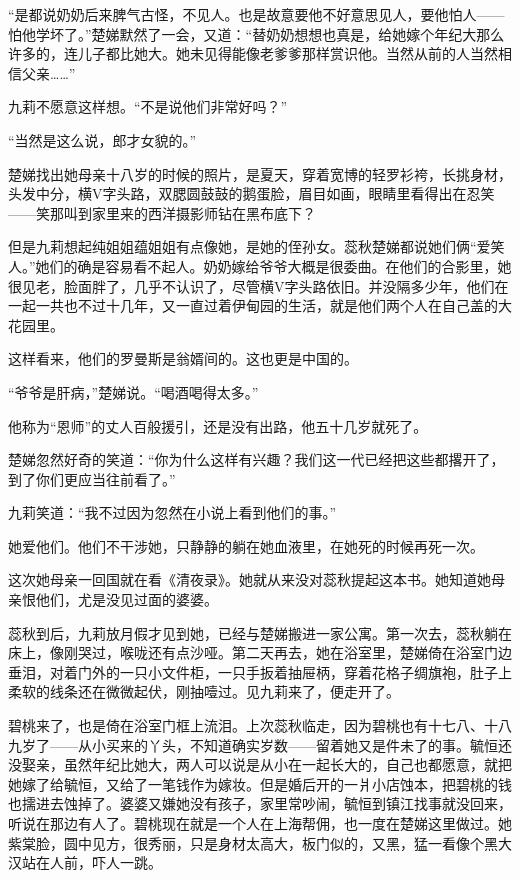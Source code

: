 \par “是都说奶奶后来脾气古怪，不见人。也是故意要他不好意思见人，要他怕人——怕他学坏了。”楚娣默然了一会，又道：“替奶奶想想也真是，给她嫁个年纪大那么许多的，连儿子都比她大。她未见得能像老爹爹那样赏识他。当然从前的人当然相信父亲……”
\par 九莉不愿意这样想。“不是说他们非常好吗？”
\par “当然是这么说，郎才女貌的。”
\par 楚娣找出她母亲十八岁的时候的照片，是夏天，穿着宽博的轻罗衫袴，长挑身材，头发中分，横V字头路，双腮圆鼓鼓的鹅蛋脸，眉目如画，眼睛里看得出在忍笑——笑那叫到家里来的西洋摄影师钻在黑布底下？
\par 但是九莉想起纯姐姐蕴姐姐有点像她，是她的侄孙女。蕊秋楚娣都说她们俩“爱笑人。”她们的确是容易看不起人。奶奶嫁给爷爷大概是很委曲。在他们的合影里，她很见老，脸面胖了，几乎不认识了，尽管横V字头路依旧。并没隔多少年，他们在一起一共也不过十几年，又一直过着伊甸园的生活，就是他们两个人在自己盖的大花园里。
\par 这样看来，他们的罗曼斯是翁婿间的。这也更是中国的。
\par “爷爷是肝病，”楚娣说。“喝酒喝得太多。”
\par 他称为“恩师”的丈人百般援引，还是没有出路，他五十几岁就死了。
\par 楚娣忽然好奇的笑道：“你为什么这样有兴趣？我们这一代已经把这些都撂开了，到了你们更应当往前看了。”
\par 九莉笑道：“我不过因为忽然在小说上看到他们的事。”
\par 她爱他们。他们不干涉她，只静静的躺在她血液里，在她死的时候再死一次。
\par 这次她母亲一回国就在看《清夜录》。她就从来没对蕊秋提起这本书。她知道她母亲恨他们，尤是没见过面的婆婆。
\par 蕊秋到后，九莉放月假才见到她，已经与楚娣搬进一家公寓。第一次去，蕊秋躺在床上，像刚哭过，喉咙还有点沙哑。第二天再去，她在浴室里，楚娣倚在浴室门边垂泪，对着门外的一只小文件柜，一只手扳着抽屉柄，穿着花格子绸旗袍，肚子上柔软的线条还在微微起伏，刚抽噎过。见九莉来了，便走开了。
\par 碧桃来了，也是倚在浴室门框上流泪。上次蕊秋临走，因为碧桃也有十七八、十八九岁了——从小买来的丫头，不知道确实岁数——留着她又是件未了的事。毓恒还没娶亲，虽然年纪比她大，两人可以说是从小在一起长大的，自己也都愿意，就把她嫁了给毓恒，又给了一笔钱作为嫁妆。但是婚后开的一爿小店蚀本，把碧桃的钱也擩进去蚀掉了。婆婆又嫌她没有孩子，家里常吵闹，毓恒到镇江找事就没回来，听说在那边有人了。碧桃现在就是一个人在上海帮佣，也一度在楚娣这里做过。她紫棠脸，圆中见方，很秀丽，只是身材太高大，板门似的，又黑，猛一看像个黑大汉站在人前，吓人一跳。
